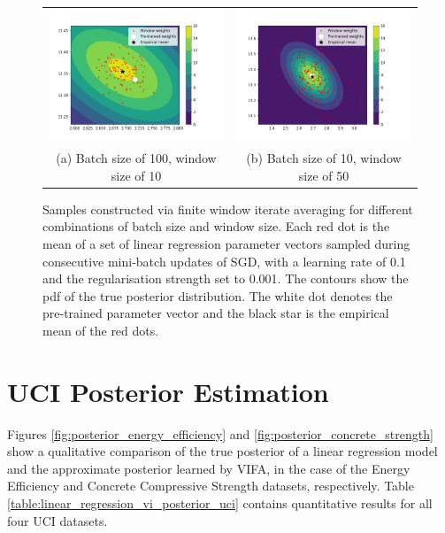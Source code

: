 \documentclass[msc,deptreport.inf]{infthesis} %
\begin{document}
\begin{figure}[!htbp] 
	\begin{tabular}{cc}
		 \includegraphics[width=70mm]{plots/linear_model_average_weight_iterates__lr=0.1__lambda=0.001__batch_size=100__window_size=10.png}
		 & \includegraphics[width=70mm]{plots/linear_model_average_weight_iterates__lr=0.1__lambda=0.001__batch_size=10__window_size=50.png} \\
		 (a) Batch size of 100, window size of 10
		 & (b) Batch size of 10, window size of 50 \\[6pt]
	\end{tabular}
	\caption{Samples constructed via finite window iterate averaging for different combinations of batch size and window size. Each red dot is the mean of a set of linear regression parameter vectors sampled during consecutive mini-batch updates of SGD, with a learning rate of 0.1 and the regularisation strength set to 0.001. The contours show the pdf of the true posterior distribution. The white dot denotes the pre-trained parameter vector and the black star is the empirical mean of the red dots.}
	\label{fig:linear_regression_average_iterates}
\end{figure}


\section{UCI Posterior Estimation}\label{app:uci_posterior}

Figures \ref{fig:posterior_energy_efficiency} and \ref{fig:posterior_concrete_strength} show a qualitative comparison of the true posterior of a linear regression model and the approximate posterior learned by VIFA, in the case of the Energy Efficiency and Concrete Compressive Strength datasets, respectively. Table \ref{table:linear_regression_vi_posterior_uci} contains quantitative results for all four UCI datasets. 
\end{document}
